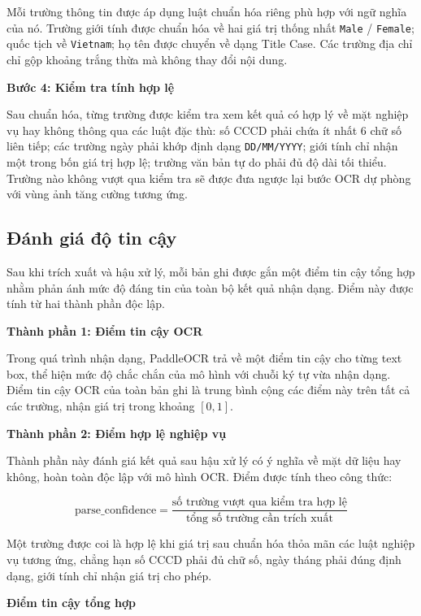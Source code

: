Mỗi trường thông tin được áp dụng luật chuẩn hóa riêng phù hợp với ngữ
nghĩa của nó. Trường giới tính được chuẩn hóa về hai giá trị thống nhất
\texttt{Male} / \texttt{Female}; quốc tịch về \texttt{Vietnam}; họ tên
được chuyển về dạng Title Case. Các trường địa chỉ chỉ gộp khoảng trắng
thừa mà không thay đổi nội dung.

\textbf{Bước 4: Kiểm tra tính hợp lệ}

Sau chuẩn hóa, từng trường được kiểm tra xem kết quả có hợp lý về mặt
nghiệp vụ hay không thông qua các luật đặc thù: số CCCD phải chứa
ít nhất 6 chữ số liên tiếp; các trường ngày phải khớp định dạng
\texttt{DD/MM/YYYY}; giới tính chỉ nhận một trong bốn giá trị hợp lệ;
trường văn bản tự do phải đủ độ dài tối thiểu. Trường nào không vượt qua
kiểm tra sẽ được đưa ngược lại bước OCR dự phòng với vùng ảnh tăng cường
tương ứng.


\subsection{Đánh giá độ tin cậy}

Sau khi trích xuất và hậu xử lý, mỗi bản ghi được gắn một điểm tin cậy
tổng hợp nhằm phản ánh mức độ đáng tin của toàn bộ kết quả nhận dạng.
Điểm này được tính từ hai thành phần độc lập.

\textbf{Thành phần 1: Điểm tin cậy OCR}

Trong quá trình nhận dạng, PaddleOCR trả về một điểm tin cậy cho từng
text box, thể hiện mức độ chắc chắn của mô hình với chuỗi ký tự vừa nhận
dạng. Điểm tin cậy OCR của toàn bản ghi là trung bình cộng các điểm này
trên tất cả các trường, nhận giá trị trong khoảng $[0, 1]$.

\textbf{Thành phần 2: Điểm hợp lệ nghiệp vụ}

Thành phần này đánh giá kết quả sau hậu xử lý có ý nghĩa về mặt dữ liệu
hay không, hoàn toàn độc lập với mô hình OCR. Điểm được tính theo công thức:

\begin{equation}
    \text{parse\_confidence} = \frac{\text{số trường vượt qua kiểm tra hợp lệ}}{\text{tổng số trường cần trích xuất}}
\end{equation}

Một trường được coi là hợp lệ khi giá trị sau chuẩn hóa thỏa mãn các
luật nghiệp vụ tương ứng, chẳng hạn số CCCD phải đủ chữ số, ngày tháng
phải đúng định dạng, giới tính chỉ nhận giá trị cho phép.

\textbf{Điểm tin cậy tổng hợp}

